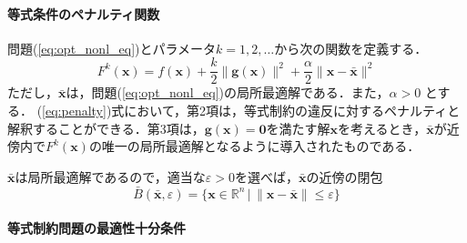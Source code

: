 \documentclass{jsreport}
\begin{document}
\paragraph{等式条件のペナルティ関数}
問題(\ref{eq:opt_nonl_eq})とパラメータ$k = 1, 2, \ldots$から次の関数を定義する．
\begin{equation}\label{eq:penalty}
  F^k(\bm{x}) = f(\bm{x}) + \frac{k}{2}\|\bm{g}(\bm{x})\|^2 + \frac{\alpha}{2}\|\bm{x} - \bar{\bm{x}}\|^2
\end{equation}
ただし，$\bar{\bm{x}}$は，問題(\ref{eq:opt_nonl_eq})の局所最適解である．また，$\alpha > 0$
とする．
(\ref{eq:penalty})式において，第2項は，等式制約の違反に対するペナルティと解釈することができる．第3項は，$\bm{g}(\bm{x}) = \bm{0}$を満たす解$\bm{x}$を考えるとき，$\bar{\bm{x}}$が近傍内で$F^k(\bm{x})$の唯一の局所最適解となるように導入されたものである．

$\bar{\bm{x}}$は局所最適解であるので，適当な$\varepsilon > 0$を選べば，$\bar{\bm{x}}$の近傍の閉包
\begin{equation}
  \bar{B}(\bar{\bm{x}}, \varepsilon) = \{\bm{x} \in \mathbb{R}^n \, | \, \|\bm{x} - \bar{\bm{x}}\| \leq \varepsilon\}
\end{equation}

\paragraph{等式制約問題の最適性十分条件}
\end{document}
